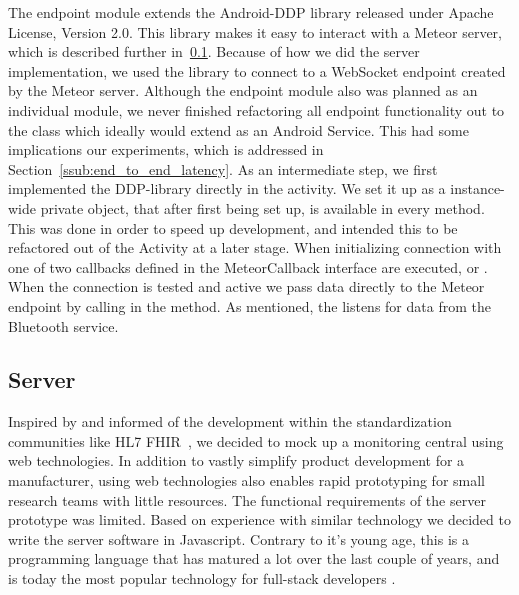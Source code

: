 The endpoint module extends the Android-DDP\cite{android:ddp} library released under Apache License, Version 2.0. This library makes it easy to interact with a Meteor server, which is described further in~\ref{sub:server}. Because of how we did the server implementation, we used the library to connect to a WebSocket endpoint created by the Meteor server.
Although the endpoint module also was planned as an individual module, we never finished refactoring all endpoint functionality out to the  class which ideally would extend as an Android Service. This had some implications our experiments, which is addressed in Section~\ref{ssub:end_to_end_latency}.
As an intermediate step, we first implemented the DDP-library directly in the  activity. We set it up as a instance-wide private object, that after first being set up, is available in every method. This was done in order to speed up development, and intended this to be refactored out of the Activity at a later stage. When initializing connection with  one of two callbacks defined in the MeteorCallback interface are executed,  or  . When the connection is tested and active we pass data directly to the Meteor endpoint by calling  in the  method. As mentioned, the  listens for data from the Bluetooth service.



\subsection{Server} %
\label{sub:server}

Inspired by \cite{Thelen:2014ew} and informed of the development within the standardization communities like HL7 FHIR~\cite{hl7:fhir}, we decided to mock up a monitoring central using web technologies. In addition to vastly simplify product development for a manufacturer, using web technologies also enables rapid prototyping for small research teams with little resources. The functional requirements of the server prototype was limited. Based on experience with similar technology we decided to write the server software in Javascript. Contrary to it's young age, this is a programming language that has matured a lot over the last couple of years, and is today the most popular technology for full-stack developers \cite{so:survey:results}.

